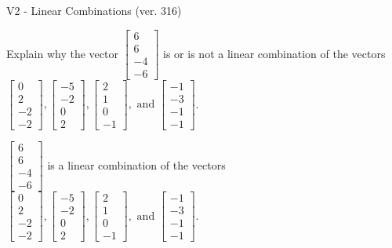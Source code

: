 \begin{exercise}
  \begin{exerciseTitle}V2 - Linear Combinations (ver. 316)\end{exerciseTitle}
  \begin{exerciseStatement}
    Explain why the vector \(\left[\begin{array}{c}
6 \\
6 \\
-4 \\
-6
\end{array}\right]\)  is or is not a linear 
	combination of the vectors \(\left[\begin{array}{c}
0 \\
2 \\
-2 \\
-2
\end{array}\right] , \left[\begin{array}{c}
-5 \\
-2 \\
0 \\
2
\end{array}\right] , \left[\begin{array}{c}
2 \\
1 \\
0 \\
-1
\end{array}\right] , \text{ and } \left[\begin{array}{c}
-1 \\
-3 \\
-1 \\
-1
\end{array}\right]\).
	


  \end{exerciseStatement}
  \begin{exerciseAnswer}
   \(\left[\begin{array}{c}
6 \\
6 \\
-4 \\
-6
\end{array}\right]\) 
  	 is  
	a linear combination of the vectors \(\left[\begin{array}{c}
0 \\
2 \\
-2 \\
-2
\end{array}\right] , \left[\begin{array}{c}
-5 \\
-2 \\
0 \\
2
\end{array}\right] , \left[\begin{array}{c}
2 \\
1 \\
0 \\
-1
\end{array}\right] , \text{ and } \left[\begin{array}{c}
-1 \\
-3 \\
-1 \\
-1
\end{array}\right]\).


\end{exerciseAnswer}
\end{exercise}
